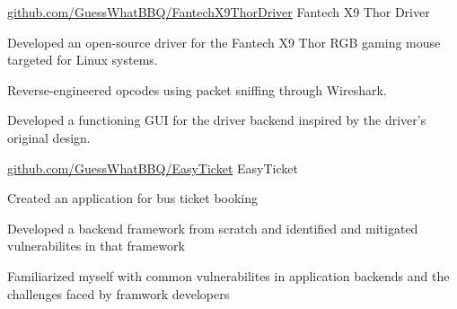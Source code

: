 

\begin{cventries}


  \cventry
    {\href{https://github.com/GuessWhatBBQ/FantechX9ThorDriver}{\faGithubSquare\acvHeaderIconSep github.com/GuessWhatBBQ/FantechX9ThorDriver}}
    {Fantech X9 Thor Driver}
    {}
    {} %
    {
      \begin{cvitems} %
        \item Developed an open-source driver for the Fantech X9 Thor RGB gaming mouse
targeted for Linux systems.
        \item Reverse-engineered opcodes using packet sniffing through Wireshark.
        \item Developed a functioning GUI for the driver backend inspired by the driver's original design.
      \end{cvitems}
    }

  \cventry
    {\href{https://github.com/GuessWhatBBQ/EasyTicket}
    {\faGithubSquare\acvHeaderIconSep github.com/GuessWhatBBQ/EasyTicket}}
    {EasyTicket}
    {}
    {} %
    {
      \begin{cvitems} %
        \item Created an application for bus ticket booking
        \item Developed a backend framework from scratch and identified and mitigated vulnerabilites in that framework
        \item Familiarized myself with common vulnerabilites in application backends and the challenges faced by framwork developers
      \end{cvitems}
    }
\end{cventries}


